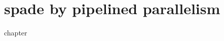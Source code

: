 \chapter{\texorpdfstring{\gls{spade}}{SPADe} by pipelined parallelism}
\label{chap:pipelined_parallelism}
\glsresetall
{chapter}